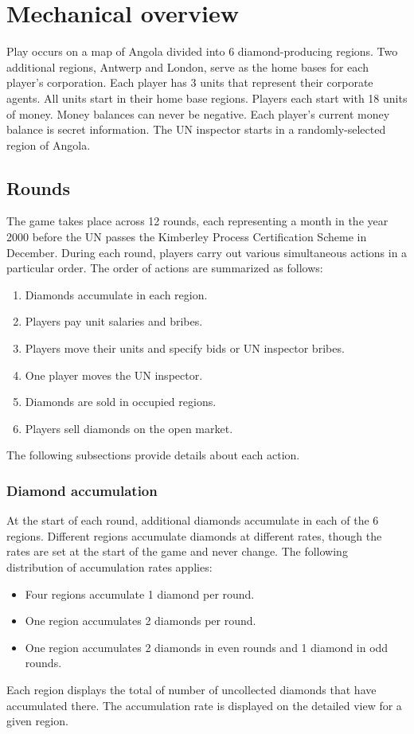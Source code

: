 \documentclass[12pt]{article}
\begin{document}
\section{Mechanical overview}

Play occurs on a map of Angola divided into 6 diamond-producing regions.  Two additional regions, Antwerp and London, serve as the home bases for each player's corporation.  Each player has 3 units that represent their corporate agents.  All units start in their home base regions.  Players each start with 18 units of money.  Money balances can never be negative.  Each player's current money balance is secret information.  The UN inspector starts in a randomly-selected region of Angola.


\subsection{Rounds}

The game takes place across 12 rounds, each representing a month in the year 2000 before the UN passes the Kimberley Process Certification Scheme in December.  During each round, players carry out various simultaneous actions in a particular order.  The order of actions are summarized as follows:
\begin{enumerate}

\item Diamonds accumulate in each region.
\item Players pay unit salaries and bribes.
\item Players move their units and specify bids or UN inspector bribes.
\item One player moves the UN inspector.
\item Diamonds are sold in occupied regions.
\item Players sell diamonds on the open market. 
\end{enumerate}
The following subsections provide details about each action.  


\subsubsection{Diamond accumulation}

At the start of each round, additional diamonds accumulate in each of the 6 regions.  Different regions accumulate diamonds at different rates, though the rates are set at the start of the game and never change.  The following distribution of accumulation rates applies:
\begin{itemize}
\item Four regions accumulate 1 diamond per round.
\item One region accumulates 2 diamonds per round.
\item One region accumulates 2 diamonds in even rounds and 1 diamond in odd rounds.
\end{itemize}
Each region displays the total of number of uncollected diamonds that have accumulated there.  The accumulation rate is displayed on the detailed view for a given region.
\end{document}
